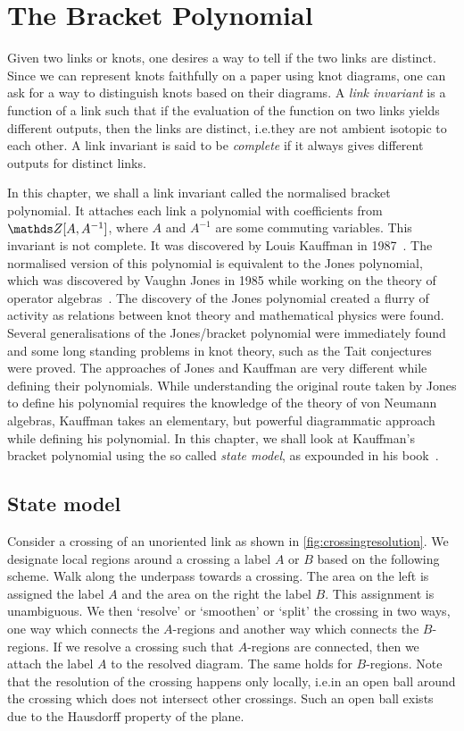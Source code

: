 \chapter{The Bracket Polynomial}

Given two links or knots, one desires a way to tell if the two links are distinct. Since we can represent knots faithfully on a paper using knot diagrams, one can ask for a way to distinguish knots based on their diagrams. A \textit{link invariant} is a function of a link such that if the evaluation of the function on two links yields different outputs, then the links are distinct, i.e.\@ they are not ambient isotopic to each other. A link invariant is said to be \textit{complete} if it always gives different outputs for distinct links.

In this chapter, we shall a link invariant called the normalised bracket polynomial. It attaches each link a polynomial with coefficients from \(\Z[A, A^{-1}]\), where \(A\) and \(A^{-1}\) are some commuting variables. This invariant is not complete. It was discovered by Louis Kauffman in 1987~\cite{kauffmanstate1987, kauffmaninvariant}. The normalised version of this polynomial is equivalent to the Jones polynomial, which was discovered by Vaughn Jones in 1985 while working on the theory of operator algebras~\cite{jones}. The discovery of the Jones polynomial created a flurry of activity as relations between knot theory and mathematical physics were found. Several generalisations of the Jones/bracket polynomial were immediately found and some long standing problems in knot theory, such as the Tait conjectures were proved. The approaches of Jones and Kauffman are very different while defining their polynomials. While understanding the original route taken by Jones to define his polynomial requires the knowledge of the theory of von Neumann algebras, Kauffman takes an elementary, but powerful diagrammatic approach while defining his polynomial. In this chapter, we shall look at Kauffman's bracket polynomial using the so called \textit{state model}, as expounded in his book~\cite{kauffman}.

\section{State model}

Consider a crossing of an unoriented link as shown in \cref{fig:crossingresolution}. We designate local regions around a crossing a label \(A\) or \(B\) based on the following scheme. Walk along the underpass towards a crossing. The area on the left is assigned the label \(A\) and the area on the right the label \(B\). This assignment is unambiguous. We then `resolve' or `smoothen' or `split' the crossing in two ways, one way which connects the \(A\)-regions and another way which connects the \(B\)-regions. If we resolve a crossing such that \(A\)-regions are connected, then we attach the label \(A\) to the resolved diagram. The same holds for \(B\)-regions. Note that the resolution of the crossing happens only locally, i.e.\@ in an open ball around the crossing which does not intersect other crossings. Such an open ball exists due to the Hausdorff property of the plane.

